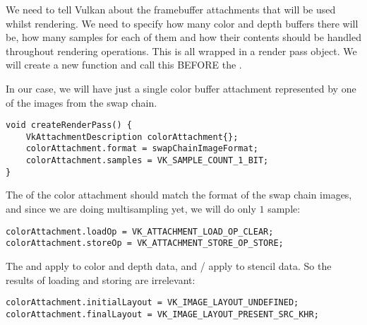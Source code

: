 \par We need to tell Vulkan about the framebuffer attachments that will be used whilst rendering. We need to specify how many color and depth buffers there will be, how many samples for each of them and how their contents should be handled throughout rendering operations. This is all wrapped in a render pass object. We will create a new  function and call this BEFORE the .

\par In our case, we will have just a single color buffer attachment represented by one of the images from the swap chain.

\begin{center}
\begin{minipage}{0.95\linewidth}
\begin{lstlisting}
void createRenderPass() {
    VkAttachmentDescription colorAttachment{};
    colorAttachment.format = swapChainImageFormat;
    colorAttachment.samples = VK_SAMPLE_COUNT_1_BIT;
}
\end{lstlisting}
\end{minipage}
\end{center}

\par The  of the color attachment should match the format of the swap chain images, and since we are doing multisampling yet, we will do only $1$ sample:

\begin{center}
\begin{minipage}{0.95\linewidth}
\begin{lstlisting}
colorAttachment.loadOp = VK_ATTACHMENT_LOAD_OP_CLEAR;
colorAttachment.storeOp = VK_ATTACHMENT_STORE_OP_STORE;
\end{lstlisting}
\end{minipage}
\end{center}

\par The  and  apply to color and depth data, and / apply to stencil data. So the results of loading and storing are irrelevant:

\begin{center}
\begin{minipage}{0.95\linewidth}
\begin{lstlisting}
colorAttachment.initialLayout = VK_IMAGE_LAYOUT_UNDEFINED;
colorAttachment.finalLayout = VK_IMAGE_LAYOUT_PRESENT_SRC_KHR;
\end{lstlisting}
\end{minipage}
\end{center}

